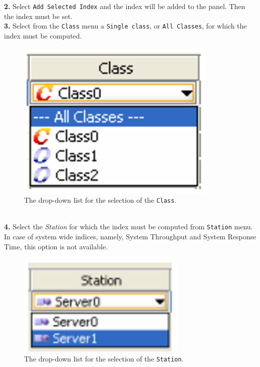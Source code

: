\textbf{2.} Select \texttt{Add Selected Index} and the index will
be added to the
panel. Then the index must be set.\\
\textbf{3.} Select from the \texttt{Class} menu a \texttt{Single
class}, or \texttt{All Classes}, for which the index must be
computed.
\begin{figure}[h!]
    \begin{center}
        \includegraphics[scale=.5]{img/jsimg/5.3.eps}
    \end{center}
    \caption{The drop-down list for the selection of the \texttt{Class}.}
    \label{fig:dropdownlistclass}
\end{figure}\\
\textbf{4.} Select the \emph{Station} for which the index must be
computed from \texttt{Station} menu. In case of system wide
indices, namely, System Throughput and System Response Time, this
option is not available.
\begin{figure}[h!]
    \begin{center}
        \includegraphics[scale=.5]{img/jsimg/5.4.eps}
    \end{center}
    \caption{The drop-down list for the selection of the \texttt{Station}.}
    \label{fig:dropdownliststat}
\end{figure}\\
